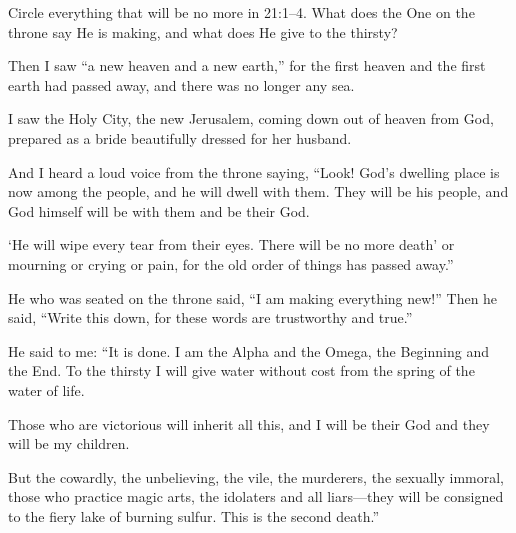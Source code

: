 \begin{ScriptureBox2}{Circle everything that will be no more in 21:1--4. What does the One on the throne say He is making, and what does He give to the thirsty?}

\item[21:1] Then I saw ``a new heaven and a new earth,'' for the first heaven and the first earth had passed away, and there was no longer any sea.

\item[21:2] I saw the Holy City, the new Jerusalem, coming down out of heaven from God, prepared as a bride beautifully dressed for her husband.

\item[21:3] And I heard a loud voice from the throne saying, ``Look! God's dwelling place is now among the people, and he will dwell with them. They will be his people, and God himself will be with them and be their God.

\item[21:4] `He will wipe every tear from their eyes. There will be no more death' or mourning or crying or pain, for the old order of things has passed away.''

\item[21:5] He who was seated on the throne said, ``I am making everything new!'' Then he said, ``Write this down, for these words are trustworthy and true.''

\item[21:6] He said to me: ``It is done. I am the Alpha and the Omega, the Beginning and the End. To the thirsty I will give water without cost from the spring of the water of life.

\item[21:7] Those who are victorious will inherit all this, and I will be their God and they will be my children.

\item[21:8] But the cowardly, the unbelieving, the vile, the murderers, the sexually immoral, those who practice magic arts, the idolaters and all liars---they will be consigned to the fiery lake of burning sulfur. This is the second death.''

\end{ScriptureBox2}

